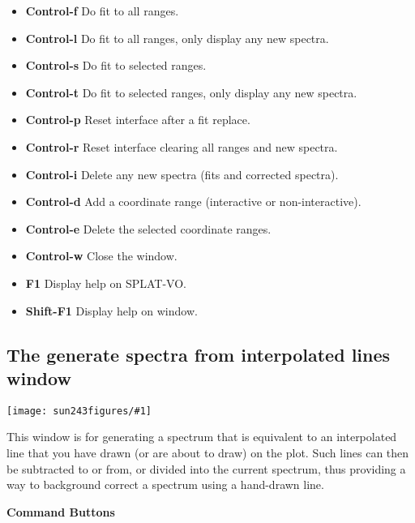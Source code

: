 \documentclass[twoside,11pt]{article}
\newcommand{\htmladdimg}[1]{}
\newcommand{\latexhtml}[2]{#1}
\renewcommand{\_}{\texttt{\symbol{95}}}
\newcommand{\SPLAT}{\textsf{SPLAT-VO}}
\newcommand{\mainfigure}[1]
{\begin{center}
 \latexhtml{\texttt{[image: sun243\_figures/\#1]}}{\htmladdimg{#1.gif}}
 \end{center}
}
\newcommand{\labelitem}[1]{\textbf{#1}}
\newcommand{\subheading}[1]{\textbf{\large{#1}}}
\begin{document}
\begin{itemize}
\item \labelitem{Control-f} Do fit to all ranges.
\item \labelitem{Control-l} Do fit to all ranges, only display any new spectra.
\item \labelitem{Control-s} Do fit to selected ranges.
\item \labelitem{Control-t} Do fit to selected ranges, only display any new spectra.
\item \labelitem{Control-p} Reset interface after a fit replace.
\item \labelitem{Control-r} Reset interface clearing all ranges and new spectra.
\item \labelitem{Control-i} Delete any new spectra (fits and corrected spectra).

\item \labelitem{Control-d} Add a coordinate range (interactive or non-interactive).
\item \labelitem{Control-e} Delete the selected coordinate ranges.

\item \labelitem{Control-w} Close the window.
\item \labelitem{F1} Display help on \SPLAT.
\item \labelitem{Shift-F1} Display help on window.
\end{itemize}


\newpage
\subsection{The generate spectra from interpolated lines window}

\mainfigure{generateline}

This window is for generating a spectrum that is equivalent to an interpolated
line that you have drawn (or are about to draw) on the plot. Such lines can
then be subtracted to or from, or divided into the current spectrum,
thus providing a way to background correct a spectrum using a hand-drawn line.

\subheading{Command Buttons}
\end{document}
